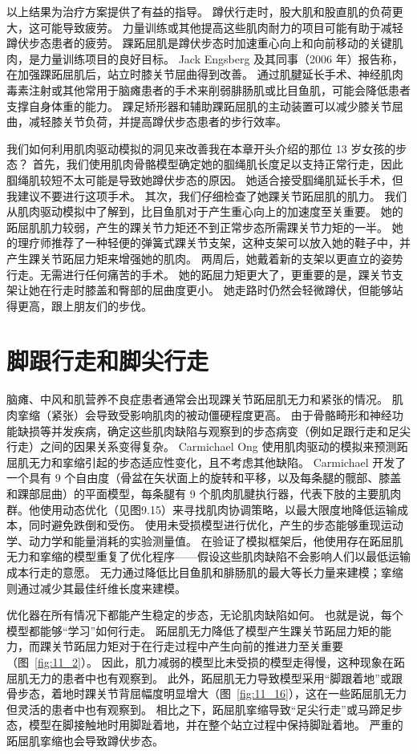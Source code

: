 以上结果为治疗方案提供了有益的指导。
蹲伏行走时，股大肌和股直肌的负荷更大，这可能导致疲劳。
力量训练或其他提高这些肌肉耐力的项目可能有助于减轻蹲伏步态患者的疲劳。
踝跖屈肌是蹲伏步态时加速重心向上和向前移动的关键肌肉，是力量训练项目的良好目标。
Jack Engsberg 及其同事（2006 年）报告称，在加强踝跖屈肌后，站立时膝关节屈曲得到改善。
通过肌腱延长手术、神经肌肉毒素注射或其他常用于脑瘫患者的手术来削弱腓肠肌或比目鱼肌，可能会降低患者支撑自身体重的能力。
踝足矫形器和辅助踝跖屈肌的主动装置可以减少膝关节屈曲，减轻膝关节负荷，并提高蹲伏步态患者的步行效率。


我们如何利用肌肉驱动模拟的洞见来改善我在本章开头介绍的那位 13 岁女孩的步态？
首先，我们使用肌肉骨骼模型确定她的腘绳肌长度足以支持正常行走，因此腘绳肌较短不太可能是导致她蹲伏步态的原因。
她适合接受腘绳肌延长手术，但我建议不要进行这项手术。
其次，我们仔细检查了她踝关节跖屈肌的肌力。
我们从肌肉驱动模拟中了解到，比目鱼肌对于产生重心向上的加速度至关重要。
她的跖屈肌肌力较弱，产生的踝关节力矩还不到正常步态所需踝关节力矩的一半。
她的理疗师推荐了一种轻便的弹簧式踝关节支架，这种支架可以放入她的鞋子中，并产生踝关节跖屈力矩来增强她的肌肉。
两周后，她戴着新的支架以更直立的姿势行走。无需进行任何痛苦的手术。
她的跖屈力矩更大了，更重要的是，踝关节支架让她在行走时膝盖和臀部的屈曲度更小。
她走路时仍然会轻微蹲伏，但能够站得更高，跟上朋友们的步伐。


\section{脚跟行走和脚尖行走}

脑瘫、中风和肌营养不良症患者通常会出现踝关节跖屈肌无力和紧张的情况。
肌肉挛缩（紧张）会导致受影响肌肉的被动僵硬程度更高。
由于骨骼畸形和神经功能缺损等并发疾病，确定这些肌肉缺陷与观察到的步态病变（例如足跟行走和足尖行走）之间的因果关系变得复杂。
Carmichael Ong 使用肌肉驱动的模拟来预测跖屈肌无力和挛缩引起的步态适应性变化，且不考虑其他缺陷。
Carmichael 开发了一个具有 9 个自由度（骨盆在矢状面上的旋转和平移，以及每条腿的髋部、膝盖和踝部屈曲）的平面模型，每条腿有 9 个肌肉肌腱执行器，代表下肢的主要肌肉群。他使用动态优化（见图9.15）来寻找肌肉协调策略，以最大限度地降低运输成本，同时避免跌倒和受伤。
使用未受损模型进行优化，产生的步态能够重现运动学、动力学和能量消耗的实验测量值。
在验证了模拟框架后，他使用存在跖屈肌无力和挛缩的模型重复了优化程序——假设这些肌肉缺陷不会影响人们以最低运输成本行走的意愿。
无力通过降低比目鱼肌和腓肠肌的最大等长力量来建模；挛缩则通过减少其最佳纤维长度来建模。


优化器在所有情况下都能产生稳定的步态，无论肌肉缺陷如何。
也就是说，每个模型都能够“学习”如何行走。
跖屈肌无力降低了模型产生踝关节跖屈力矩的能力，而踝关节跖屈力矩对于在行走过程中产生向前的推进力至关重要（图~\ref{fig:11_2}）。
因此，肌力减弱的模型比未受损的模型走得慢，这种现象在跖屈肌无力的患者中也有观察到。
此外，跖屈肌无力导致模型采用“脚跟着地”或跟骨步态，着地时踝关节背屈幅度明显增大（图~\ref{fig:11_16}），这在一些跖屈肌无力但灵活的患者中也有观察到。
相比之下，跖屈肌挛缩导致“足尖行走”或马蹄足步态，模型在脚接触地时用脚趾着地，并在整个站立过程中保持脚趾着地。
严重的跖屈肌挛缩也会导致蹲伏步态。


